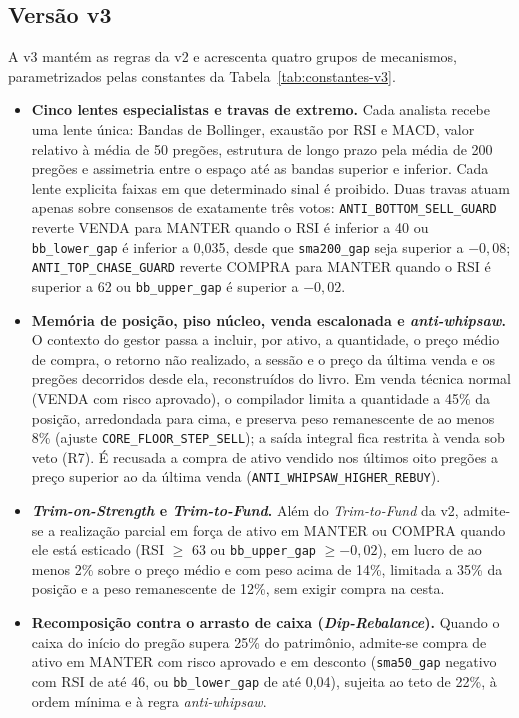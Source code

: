\subsection{Versão v3}

A v3 mantém as regras da v2 e acrescenta quatro grupos de mecanismos, parametrizados pelas constantes da Tabela~\ref{tab:constantes-v3}.

\begin{itemize}
  \item \textbf{Cinco lentes especialistas e travas de extremo.} Cada analista recebe uma lente única: Bandas de Bollinger, exaustão por RSI e MACD, valor relativo à média de 50 pregões, estrutura de longo prazo pela média de 200 pregões e assimetria entre o espaço até as bandas superior e inferior. Cada lente explicita faixas em que determinado sinal é proibido. Duas travas atuam apenas sobre consensos de exatamente três votos: \texttt{ANTI\_BOTTOM\_SELL\_GUARD} reverte VENDA para MANTER quando o RSI é inferior a 40 ou \texttt{bb\_lower\_gap} é inferior a 0,035, desde que \texttt{sma200\_gap} seja superior a $-0{,}08$; \texttt{ANTI\_TOP\_CHASE\_GUARD} reverte COMPRA para MANTER quando o RSI é superior a 62 ou \texttt{bb\_upper\_gap} é superior a $-0{,}02$.
  \item \textbf{Memória de posição, piso núcleo, venda escalonada e \textit{anti-whipsaw}.} O contexto do gestor passa a incluir, por ativo, a quantidade, o preço médio de compra, o retorno não realizado, a sessão e o preço da última venda e os pregões decorridos desde ela, reconstruídos do livro. Em venda técnica normal (VENDA com risco aprovado), o compilador limita a quantidade a 45\% da posição, arredondada para cima, e preserva peso remanescente de ao menos 8\% (ajuste \texttt{CORE\_FLOOR\_STEP\_SELL}); a saída integral fica restrita à venda sob veto (R7). É recusada a compra de ativo vendido nos últimos oito pregões a preço superior ao da última venda (\texttt{ANTI\_WHIPSAW\_HIGHER\_REBUY}).
  \item \textbf{\textit{Trim-on-Strength} e \textit{Trim-to-Fund}.} Além do \textit{Trim-to-Fund} da v2, admite-se a realização parcial em força de ativo em MANTER ou COMPRA quando ele está esticado (RSI $\geq$ 63 ou \texttt{bb\_upper\_gap} $\geq -0{,}02$), em lucro de ao menos 2\% sobre o preço médio e com peso acima de 14\%, limitada a 35\% da posição e a peso remanescente de 12\%, sem exigir compra na cesta.
  \item \textbf{Recomposição contra o arrasto de caixa (\textit{Dip-Rebalance}).} Quando o caixa do início do pregão supera 25\% do patrimônio, admite-se compra de ativo em MANTER com risco aprovado e em desconto (\texttt{sma50\_gap} negativo com RSI de até 46, ou \texttt{bb\_lower\_gap} de até 0,04), sujeita ao teto de 22\%, à ordem mínima e à regra \textit{anti-whipsaw}.
\end{itemize}



